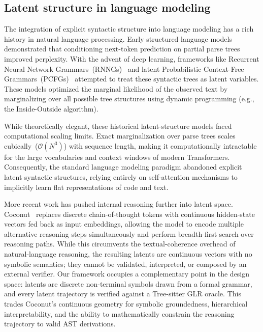 \documentclass[11pt]{article}
\theoremstyle{plain}
\theoremstyle{definition}
\begin{document}
\subsection{Latent structure in language modeling}

The integration of explicit syntactic structure into language modeling has a
rich history in natural language processing. Early structured
language models~\cite{chelba-jelinek,
roark-2001, charniak} demonstrated that conditioning next-token prediction on
partial parse trees improved perplexity. With the advent of deep learning,
frameworks like Recurrent Neural Network Grammars~(RNNGs)~\cite{rnng} and latent
Probabilistic Context-Free Grammars~(PCFGs)~\cite{kim-etal-2019} attempted to
treat these syntactic trees as latent variables. These models optimized the
marginal likelihood of the observed text by marginalizing over all possible tree
structures using dynamic programming (e.g., the Inside-Outside algorithm).

While theoretically elegant, these historical latent-structure models faced
computational scaling limits. Exact marginalization over parse trees scales
cubically~(\(\mathcal{O}(N^3)\)) with sequence length, making it computationally
intractable for the large vocabularies and context windows of modern
Transformers.
Consequently, the standard language modeling paradigm abandoned explicit latent
syntactic structures, relying entirely on self-attention mechanisms to
implicitly learn flat representations of code and text.

More recent work has pushed internal reasoning further into latent space.
Coconut~\cite{coconut-2025} replaces discrete chain-of-thought tokens with
continuous hidden-state vectors fed back as input embeddings, allowing the model
to encode multiple alternative reasoning steps simultaneously and perform
breadth-first search over reasoning paths. While this circumvents the
textual-coherence overhead of natural-language reasoning, the resulting latents
are continuous vectors with no symbolic semantics; they cannot be validated,
interpreted, or composed by an external verifier. Our framework occupies a
complementary point in the design space: latents are discrete non-terminal
symbols drawn from a formal grammar, and every latent trajectory is verified
against a Tree-sitter GLR oracle. This trades Coconut's continuous geometry for
symbolic groundedness, hierarchical interpretability, and the ability to
mathematically constrain the reasoning trajectory to valid AST derivations.
\end{document}
